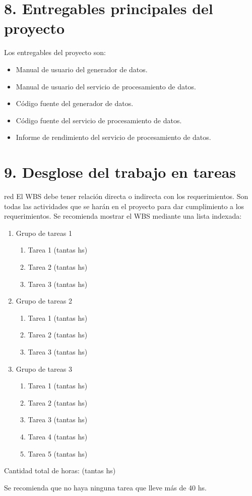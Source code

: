 \documentclass[
11pt, %
]{charter}
\begin{document}
\section{8. Entregables principales del proyecto}
\label{sec:entregables}

Los entregables del proyecto son:

\begin{itemize}
	\item Manual de usuario del generador de datos.
	\item Manual de usuario del servicio de procesamiento de datos.
	\item Código fuente del generador de datos.
	\item Código fuente del servicio de procesamiento de datos.
	\item Informe de rendimiento del servicio de procesamiento de datos.
\end{itemize}


\section{9. Desglose del trabajo en tareas}
\label{sec:wbs}

\begin{consigna}{red}
El WBS debe tener relación directa o indirecta con los requerimientos.  Son todas las actividades que se harán en el proyecto para dar cumplimiento a los requerimientos. Se recomienda mostrar el WBS mediante una lista indexada:

\begin{enumerate}
\item Grupo de tareas 1
	\begin{enumerate}
	\item Tarea 1 (tantas hs)
	\item Tarea 2 (tantas hs)
	\item Tarea 3 (tantas hs)
	\end{enumerate}
\item Grupo de tareas 2
	\begin{enumerate}
	\item Tarea 1 (tantas hs)
	\item Tarea 2 (tantas hs)
	\item Tarea 3 (tantas hs)
	\end{enumerate}
\item Grupo de tareas 3
	\begin{enumerate}
	\item Tarea 1 (tantas hs)
	\item Tarea 2 (tantas hs)
	\item Tarea 3 (tantas hs)
	\item Tarea 4 (tantas hs)
	\item Tarea 5 (tantas hs)
	\end{enumerate}
\end{enumerate}

Cantidad total de horas: (tantas hs)

Se recomienda que no haya ninguna tarea que lleve más de 40 hs. 

\end{consigna}
\end{document}
